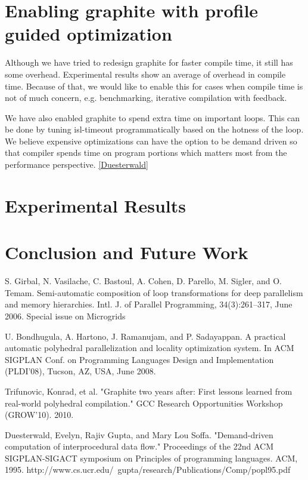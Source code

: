 \section{Enabling graphite with profile guided optimization}
Although we have tried to redesign graphite for faster compile time, it still has some overhead.
Experimental results show an average of {} overhead in compile time.
Because of that, we would like to enable this for cases when compile time is not of much concern,
e.g. benchmarking, iterative compilation with feedback.

We have also enabled graphite to spend extra time on important loops. This can be done by tuning
isl-timeout programmatically based on the hotness of the loop. We believe expensive optimizations
can have the option to be demand driven so that compiler spends time on program portions which matters
most from the performance perspective. \ref{Duesterwald}


\section{Experimental Results}

\section{Conclusion and Future Work}



S. Girbal, N. Vasilache, C. Bastoul, A. Cohen, D. Parello, M. Sigler, and O. Temam.
Semi-automatic composition of loop transformations for deep parallelism and memory
hierarchies. Intl. J. of Parallel Programming, 34(3):261–317, June 2006. Special issue on
Microgrids


U. Bondhugula, A. Hartono, J. Ramanujam, and P. Sadayappan. A practical automatic
polyhedral parallelization and locality optimization system. In ACM SIGPLAN Conf. on
Programming Languages Design and Implementation (PLDI’08), Tucson, AZ, USA, June
2008.

Trifunovic, Konrad, et al. "Graphite two years after: First lessons learned
from real-world polyhedral compilation."
GCC Research Opportunities Workshop (GROW'10). 2010.


Duesterwald, Evelyn, Rajiv Gupta, and Mary Lou Soffa. "Demand-driven computation of interprocedural data flow." Proceedings of the 22nd ACM SIGPLAN-SIGACT symposium on Principles of programming languages. ACM, 1995.
http://www.cs.ucr.edu/~gupta/research/Publications/Comp/popl95.pdf

